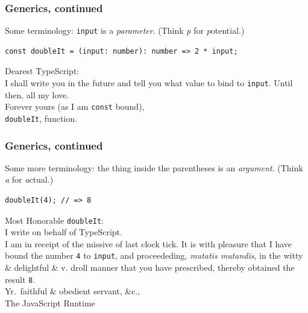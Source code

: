 \documentclass[aspectratio=169]{beamer}
\begin{document}
\begin{frame}[fragile]
  \frametitle{Generics, continued}

  Some terminology: \texttt{input} is a \textit{parameter}. (Think \textit{p}
  for \textit{p}otential.) \\

  \begin{verbatim}
const doubleIt = (input: number): number => 2 * input;
  \end{verbatim}

  \vspace{1em}

  \begin{tcolorbox}
    Dearest TypeScript: \\

    I shall write you in the future and tell you what value to bind to
    \texttt{input}. Until then, all my love. \\

    Forever yours (as I am \texttt{const} bound), \\
    \texttt{doubleIt}, function.
  \end{tcolorbox}
\end{frame}

\begin{frame}[fragile]
  \frametitle{Generics, continued}

  Some more terminology: the thing inside the parentheses is an
  \textit{argument}. (Think \textit{a} for \textit{a}ctual.)

  \vspace{1em}

  \begin{verbatim}
doubleIt(4); // => 8
  \end{verbatim}

  \vspace{1em}

  \begin{tcolorbox}
    \small
    Most Honorable \texttt{doubleIt}: \\

    I write on behalf of TypeScript. \\

    I am in receipt of the missive of last clock tick. It is with pleasure that
    I have bound the number \texttt{4} to \texttt{input}, and proceededing,
    \textit{mutatis mutandis}, in the witty \& delightful \& v. droll manner
    that you have prescribed, thereby obtained the result \texttt{8}. \\

    Yr.\ faithful \& obedient servant, \&c., \\
    The JavaScript Runtime \\
  \end{tcolorbox}
\end{frame}
\end{document}
